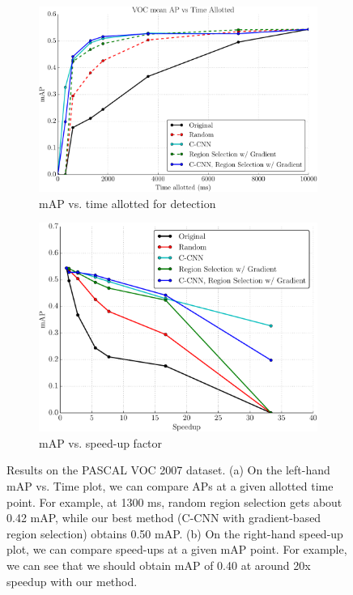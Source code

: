 \begin{figure}[ht]
\centering
\begin{subfigure}[b]{0.52\linewidth}
    \includegraphics[width=\linewidth]{figures/_apvst_final.pdf}
    \caption{mAP vs. time allotted for detection}\label{fig:apvst}
\end{subfigure}\hfill
\begin{subfigure}[b]{0.45\linewidth}
    \includegraphics[width=\linewidth]{figures/_speedup_final_abs.pdf}
    \caption{mAP vs. speed-up factor}\label{fig:speedup}
\end{subfigure}
\caption{
Results on the PASCAL VOC 2007 dataset.
(a) On the left-hand mAP vs. Time plot, we can compare APs at a given allotted time point.
For example, at 1300 ms, random region selection gets about 0.42 mAP, while our best method (C-CNN with gradient-based region selection) obtains 0.50 mAP.
(b) On the right-hand speed-up plot, we can compare speed-ups at a given mAP point.
For example, we can see that we should obtain mAP of 0.40 at around 20x speedup with our method.
}\label{fig:voc2007_results}
\end{figure}
